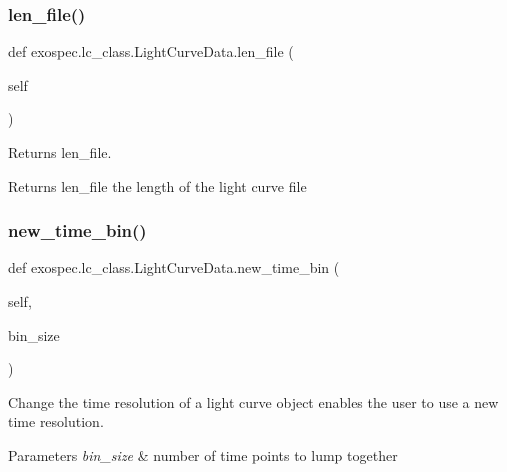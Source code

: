 \subsubsection{\texorpdfstring{len\+\_\+file()}{len\_file()}}
{\footnotesize\ttfamily def exospec.\+lc\+\_\+class.\+Light\+Curve\+Data.\+len\+\_\+file (\begin{DoxyParamCaption}\item[{}]{self }\end{DoxyParamCaption})}



Returns len\+\_\+file. 

\begin{DoxyReturn}{Returns}
len\+\_\+file the length of the light curve file 
\end{DoxyReturn}
\mbox{\label{classexospec_1_1lc__class_1_1_light_curve_data_ad09684789cb0431662a673f72aef7ac8}} 
\subsubsection{\texorpdfstring{new\+\_\+time\+\_\+bin()}{new\_time\_bin()}}
{\footnotesize\ttfamily def exospec.\+lc\+\_\+class.\+Light\+Curve\+Data.\+new\+\_\+time\+\_\+bin (\begin{DoxyParamCaption}\item[{}]{self,  }\item[{}]{bin\+\_\+size }\end{DoxyParamCaption})}



Change the time resolution of a light curve object enables the user to use a new time resolution. 


\begin{DoxyParams}{Parameters}
{\em bin\+\_\+size} & number of time points to lump together \\
\hline
\end{DoxyParams}
\mbox{\label{classexospec_1_1lc__class_1_1_light_curve_data_ab383d2dc1788a08a0336cb694f01c906}} 
